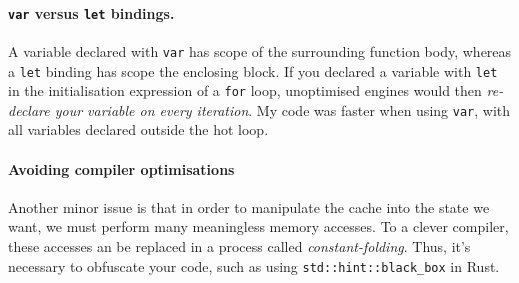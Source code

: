 \documentclass[a4paper,10pt,twocolumn]{article}
\theoremstyle{definition}
\newcommand*{\code}{\texttt}
\begin{document}
\paragraph{\code{var} versus \code{let} bindings.}
A variable declared with \code{var} has scope of the surrounding function body,
whereas a \code{let} binding has scope the enclosing block.
If you declared a variable with \code{let} in the initialisation expression of a
\code{for} loop, unoptimised engines would then \emph{re-declare your variable
on every iteration}.
My code was faster when using \code{var}, with all variables declared outside
the hot loop.

% 

\paragraph{Avoiding compiler optimisations}
Another minor issue is that in order to manipulate the cache into the state we
want, we must perform many meaningless memory accesses.
To a clever compiler, these accesses an be replaced in a process called
\emph{constant-folding}.
Thus, it's necessary to obfuscate your code, such as using
\code{std::hint::black\_box} in Rust.

\end{document}

